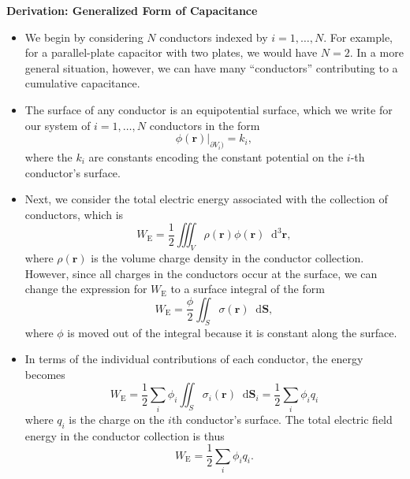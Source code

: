 \documentclass[11pt, a4paper]{article}
\newcommand{\diff}{\mathop{}\!\mathrm{d}} %
\newcommand{\dr}{\diff^{3} \r}  %
\renewcommand{\vec}[1]{\bm{#1}} %
\renewcommand{\r}{\vec{r}}
\begin{document}
\textbf{Derivation: Generalized Form of Capacitance}
\begin{itemize}
	
	\item We begin by considering $ N $ conductors indexed by $ i = 1, \ldots, N $. For example, for a parallel-plate capacitor with two plates, we would have $ N = 2 $. In a more general situation, however, we can have many ``conductors'' contributing to a cumulative capacitance. 
	
    \item The surface of any conductor is an equipotential surface, which we write for our system of $ i = 1, \ldots, N $ conductors in the form
	\begin{equation*}
        \phi(\r) \big |_{\partial V_{i})}  = k_{i},
	\end{equation*}
	where the $ k_{i} $ are constants encoding the constant potential on the $ i $-th conductor's surface.
	
	\item Next, we consider the total electric energy associated with the collection of conductors, which is
	\begin{equation*}
		W_{\text{E}} = \frac{1}{2}\iiint_{V}\rho(\r)\phi(\r)\dr,
	\end{equation*}
	where $ \rho(\r) $ is the volume charge density in the conductor collection. However, since all charges in the conductors occur at the surface, we can change the expression for $ W_{\text{E}} $ to a surface integral of the form
	\begin{equation*}
		W_{\text{E}} = \frac{\phi}{2} \iint_{S} \sigma(\r) \diff \vec{S},
	\end{equation*}
	where $ \phi $ is moved out of the integral because it is constant along the surface. 

    \item In terms of the individual contributions of each conductor, the energy becomes
	\begin{equation*}
		W_{\text{E}} = \frac{1}{2}\sum_{i} \phi_{i} \iint_{S} \sigma_{i}(\r) \diff \vec{S}_{i} = \frac{1}{2}\sum_{i} \phi_{i} q_{i}
	\end{equation*}
	where $ q_{i} $ is the charge on the $ i $th conductor's surface. The total electric field energy in the conductor collection is thus
	\begin{equation*}
		W_{\text{E}} = \frac{1}{2}\sum_{i} \phi_{i}q_{i}.
	\end{equation*}
	

\end{itemize}
\end{document}
